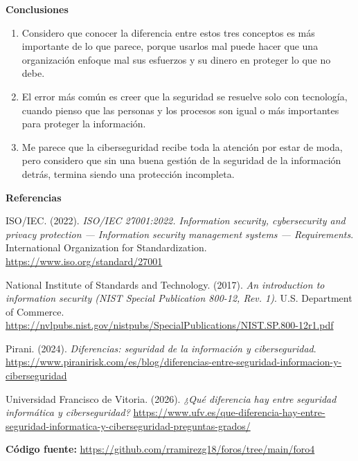 \documentclass[12pt,letterpaper]{article}
\newcommand{\subtitulo}[1]{\vspace{12pt}\noindent\textbf{#1}\par\vspace{10pt}}
\begin{document}
\subtitulo{Conclusiones}
\begin{enumerate}[label=\arabic*., left=0pt, itemsep=2pt]
\item Considero que conocer la diferencia entre estos tres conceptos es más importante de lo que parece, porque usarlos mal puede hacer que una organización enfoque mal sus esfuerzos y su dinero en proteger lo que no debe.
\item El error más común es creer que la seguridad se resuelve solo con tecnología, cuando pienso que las personas y los procesos son igual o más importantes para proteger la información.
\item Me parece que la ciberseguridad recibe toda la atención por estar de moda, pero considero que sin una buena gestión de la seguridad de la información detrás, termina siendo una protección incompleta.
\end{enumerate}

\subtitulo{Referencias}

\hangindent=1cm \noindent ISO/IEC. (2022). \textit{ISO/IEC 27001:2022. Information security, cybersecurity and privacy protection — Information security management systems — Requirements}. International Organization for Standardization. \url{https://www.iso.org/standard/27001}

\vspace{4pt}
\hangindent=1cm \noindent National Institute of Standards and Technology. (2017). \textit{An introduction to information security (NIST Special Publication 800-12, Rev. 1)}. U.S. Department of Commerce. \url{https://nvlpubs.nist.gov/nistpubs/SpecialPublications/NIST.SP.800-12r1.pdf}

\vspace{4pt}
\hangindent=1cm \noindent Pirani. (2024). \textit{Diferencias: seguridad de la información y ciberseguridad}. \url{https://www.piranirisk.com/es/blog/diferencias-entre-seguridad-informacion-y-ciberseguridad}

\vspace{4pt}
\hangindent=1cm \noindent Universidad Francisco de Vitoria. (2026). \textit{¿Qué diferencia hay entre seguridad informática y ciberseguridad?} \url{https://www.ufv.es/que-diferencia-hay-entre-seguridad-informatica-y-ciberseguridad-preguntas-grados/}

\vspace{14pt}
\noindent\small \textbf{Código fuente:} \url{https://github.com/rramirezg18/foros/tree/main/foro4}
\end{document}
